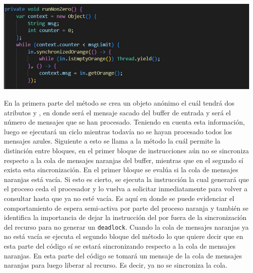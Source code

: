 \documentclass[a4paper]{article}
\begin{document}
    \begin{center}
        \includegraphics[scale=0.5]{N1.jpeg}    
    \end{center}
    En la primera parte del m\'etodo  se crea un objeto an\'onimo  el cu\'al tendr\'a dos atributos  y , en donde  ser\'a el mensaje sacado del buffer de entrada y  ser\'a el n\'umero de mensajes que se han procesado.
    Teniendo en cuenta esta informaci\'on, luego se ejecutar\'a un ciclo mientras todav\'ia no se hayan procesado todos los mensajes azules.
    Siguiente a esto se llama a la m\'etodo  la cu\'al permite la distinci\'on entre bloques, en el primer bloque de instrucciones a\'un no se sincroniza respecto a la cola de mensajes naranjas del buffer, mientras que en el segundo s\'i exista esta sincronizaci\'on.
    En el primer bloque se eval\'ua si la cola de mensajes naranjas est\'a vac\'ia.
    Si esto es cierto, se ejecuta la instrucci\'on  la cual generar\'a que el proceso ceda el procesador y lo vuelva a solicitar inmediatamente para volver a consultar hasta que ya no est\'e vac\'ia.
    Es aqu\'i en donde se puede evidenciar el comportamiento de espera semi-activa por parte del proceso naranja y tambi\'en se identifica la importancia de dejar la instrucci\'on del  por fuera de la sincronizaci\'on del recurso para no generar un \texttt{deadlock}.
    Cuando la cola de mensajes naranjas ya no est\'a vac\'ia se ejecuta el segundo bloque del m\'etodo  lo que quiere decir que en esta parte del c\'odigo s\'i se estar\'a sincronizando respecto a la cola de mensajes naranjas.
    En esta parte del c\'odigo se tomar\'a un mensaje de la cola de mensajes naranjas para luego liberar al recurso.
    Es decir, ya no se sincroniza la cola.\\
\end{document}
